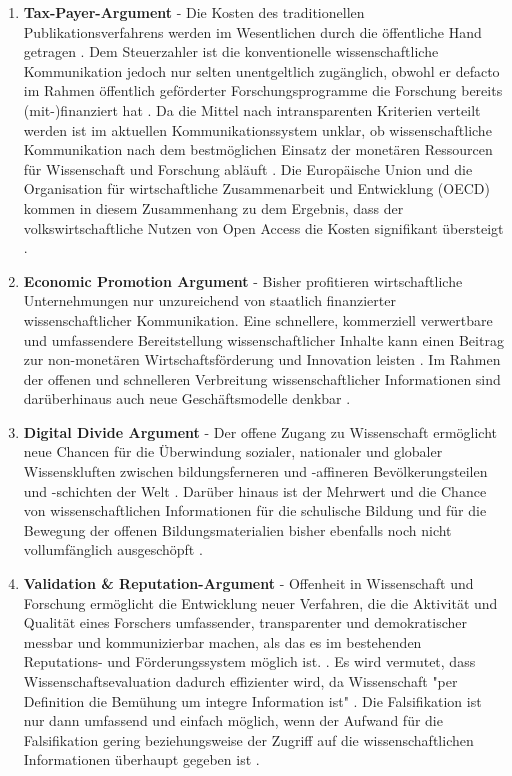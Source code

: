 \begin{enumerate}
\item \textbf{Tax-Payer-Argument} - Die Kosten des traditionellen Publikationsverfahrens werden im Wesentlichen durch die öffentliche Hand getragen \cite{muller_2010_open}. Dem Steuerzahler ist die konventionelle wissenschaftliche Kommunikation jedoch nur selten unentgeltlich zugänglich, obwohl er defacto im Rahmen öffentlich geförderter Forschungsprogramme die Forschung bereits (mit-)finanziert hat \cite{suber_2003_taxpayer} \cite{Beverungen_2012} \cite{Adema_2014_open_access}. Da die Mittel nach intransparenten Kriterien verteilt werden ist im aktuellen Kommunikationssystem unklar, ob wissenschaftliche Kommunikation nach dem bestmöglichen Einsatz der monetären Ressourcen für Wissenschaft und Forschung abläuft \cite{Glasziou_2014} \cite{altman_1994_scandal}. Die Europäische Union und die Organisation für wirtschaftliche Zusammenarbeit und Entwicklung (OECD) kommen in diesem Zusammenhang zu dem Ergebnis, dass der volkswirtschaftliche Nutzen von Open Access die Kosten signifikant übersteigt \cite{WD_bundestag_2009}.
\item \textbf{Economic Promotion Argument} - Bisher profitieren wirtschaftliche Unternehmungen nur unzureichend von staatlich finanzierter wissenschaftlicher Kommunikation. Eine schnellere, kommerziell verwertbare und umfassendere Bereitstellung wissenschaftlicher Inhalte kann einen Beitrag zur non-monetären Wirtschaftsförderung und Innovation leisten \cite{heise_2012} \cite{suchen OECD EU}. Im Rahmen der offenen und schnelleren Verbreitung wissenschaftlicher Informationen sind darüberhinaus auch neue Geschäftsmodelle denkbar \cite{suchen}.
\item \textbf{Digital Divide Argument} - Der offene Zugang zu Wissenschaft ermöglicht neue Chancen für die Überwindung sozialer, nationaler und globaler Wissenskluften \cite{suchen} zwischen bildungsferneren und -affineren Bevölkerungsteilen und -schichten der Welt \cite{boai_2012}. Darüber hinaus ist der Mehrwert und die Chance von wissenschaftlichen Informationen für die schulische Bildung und für die Bewegung der offenen Bildungsmaterialien bisher ebenfalls noch nicht vollumfänglich ausgeschöpft \cite{heise_lernen_2013}.
\item \textbf{Validation & Reputation-Argument} - Offenheit in Wissenschaft und Forschung ermöglicht die Entwicklung neuer Verfahren, die die Aktivität und Qualität eines Forschers umfassender, transparenter und demokratischer messbar und kommunizierbar machen, als das es im bestehenden Reputations- und Förderungssystem möglich ist. \cite{chalmers_2009_avoidable_waste}. Es wird vermutet, dass Wissenschaftsevaluation dadurch effizienter wird, da Wissenschaft "per Definition die Bemühung um integre Information ist" \cite{umstatter_2007_qualitatssicherung}. Die Falsifikation ist nur dann umfassend und einfach möglich, wenn der Aufwand für die Falsifikation gering beziehungsweise der Zugriff auf die wissenschaftlichen Informationen überhaupt gegeben ist \cite{umstatter_2007_qualitatssicherung}.

\end{enumerate}
